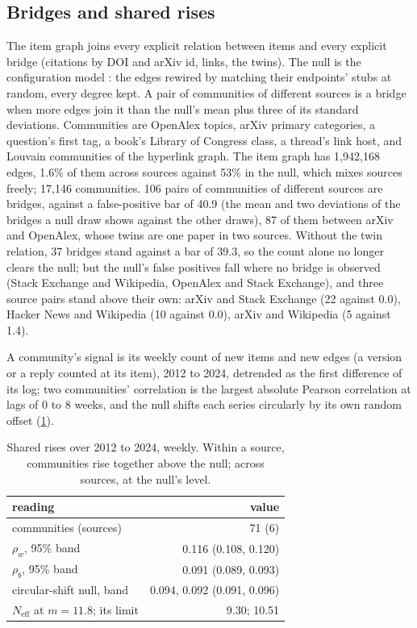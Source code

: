 \documentclass[11pt]{article}
\theoremstyle{plain}
\theoremstyle{definition}
\theoremstyle{remark}
\begin{document}
\subsection{Bridges and shared rises}
The item graph joins every explicit relation between items and every explicit bridge (citations by
DOI and arXiv id, links, the twins). The null is the configuration model \citep{molloy1995critical}:
the edges rewired by matching their endpoints' stubs at random, every degree kept. A pair of
communities of different sources is a bridge when more edges join it than the null's mean plus three
of its standard deviations. Communities are OpenAlex topics, arXiv primary categories, a question's
first tag, a book's Library of Congress class, a thread's link host, and Louvain communities
\citep{blondel2008louvain} of the hyperlink graph. The item graph has 1,942,168 edges, 1.6\% of them across sources against 53\% in the null, which mixes sources freely; 17,146 communities. 106 pairs of communities of different sources are bridges, against a false-positive bar of 40.9 (the mean and two deviations of the bridges a null draw shows against the other draws), 87 of them between arXiv and OpenAlex, whose twins are one paper in two sources. Without the twin relation, 37 bridges stand against a bar of 39.3, so the count alone no longer clears the null; but the null's false positives fall where no bridge is observed (Stack Exchange and Wikipedia, OpenAlex and Stack Exchange), and three source pairs stand above their own: arXiv and Stack Exchange (22 against 0.0), Hacker News and Wikipedia (10 against 0.0), arXiv and Wikipedia (5 against 1.4).

A community's signal is its weekly count of new items and new edges (a version or a reply counted at
its item), 2012 to 2024, detrended as the first difference of its log; two communities' correlation is
the largest absolute Pearson correlation at lags of 0 to 8 weeks, and the null shifts each series
circularly by its own random offset (\cref{tab:rises}).

\begin{table}[ht]
\centering\small
\begin{tabular}{lr}
\toprule
reading & value\\
\midrule
communities (sources) & 71 (6)\\
$\rho_w$, 95\% band & 0.116 (0.108, 0.120)\\
$\rho_b$, 95\% band & 0.091 (0.089, 0.093)\\
circular-shift null, band & 0.094, 0.092 (0.091, 0.096)\\
$N_{\mathrm{eff}}$ at $m = 11.8$; its limit & 9.30; 10.51\\
\bottomrule
\end{tabular}
\caption{Shared rises over 2012 to 2024, weekly. Within a source, communities rise together above the null; across sources, at the null's level.}
\label{tab:rises}
\end{table}
\end{document}
